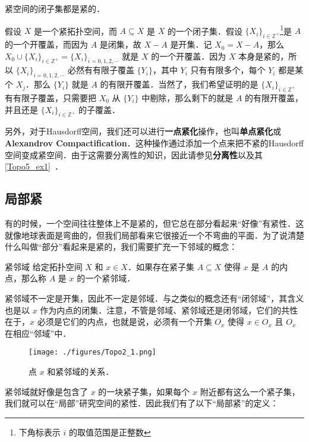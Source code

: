 \begin{theorem}{}\label{Topo2_the2}
紧空间的闭子集都是紧的．
\end{theorem}

假设 $X$ 是一个紧拓扑空间，而 $A\subseteq X$ 是 $X$ 的一个闭子集．假设 $\{X_i\}_{i\in \mathbb{Z}^+}$\footnote{下角标表示 $i$ 的取值范围是正整数}是 $A$ 的一个开覆盖，而因为 $A$ 是闭集，故 $X-A$ 是开集．记 $X_0=X-A$，那么 $X_0\cup\{X_i\}_{i\in \mathbb{Z}^+}=\{X_i\}_{i=0, 1, 2, \cdots}$ 就是 $X$ 的一个开覆盖．因为 $X$ 本身是紧的，所以 $\{X_i\}_{i=0, 1, 2, \cdots}$ 必然有有限子覆盖 $\{Y_i\}$，其中 $Y_i$ 只有有限多个，每个 $Y_i$ 都是某个 $X_j$．那么 $\{Y_i\}$ 就是 $A$ 的有限开覆盖．当然了，我们希望证明的是 $\{X_i\}_{i\in \mathbb{Z}^+}$ 有有限子覆盖，只需要把 $X_0$ 从 $\{Y_i\}$ 中剔除，那么剩下的就是 $A$ 的有限开覆盖，并且还是 $\{X_i\}_{i\in \mathbb{Z}^+}$ 的子覆盖．

另外，对于Hausdorff空间，我们还可以进行\textbf{一点紧化}操作，也叫\textbf{单点紧化}或\textbf{Alexandrov Compactification}．这种操作通过添加一个点来把不紧的Hausdorff空间变成紧空间．由于这需要分离性的知识，因此请参见\textbf{分离性}以及其\autoref{Topo5_ex1}~．

\subsection{局部紧}

有的时候，一个空间往往整体上不是紧的，但它总在部分看起来“好像”有紧性．这就像地球表面是弯曲的，但我们局部看来它很接近一个不弯曲的平面．为了说清楚什么叫做“部分”看起来是紧的，我们需要扩充一下邻域的概念：

\begin{definition}{紧邻域}
给定拓扑空间 $X$ 和 $x\in X$．如果存在紧子集 $A\subseteq X$ 使得 $x$ 是 $A$ 的内点，那么称 $A$ 是 $x$ 的一个紧邻域．
\end{definition}

紧邻域不一定是开集，因此不一定是邻域．与之类似的概念还有“闭邻域”，其含义也是以 $x$ 作为内点的闭集．注意，不管是邻域、紧邻域还是闭邻域，它们的共性在于，$x$ 必须是它们的内点，也就是说，必须有一个开集 $O_x$ 使得 $x\in O_x$ 且 $O_x$ 在相应“邻域”中．

\begin{figure}[ht]
\centering
\texttt{[image: ./figures/Topo2\_1.png]}
\caption{点 $x$ 和紧邻域的关系．} \label{Topo2_fig1}
\end{figure}

紧邻域就好像是包含了 $x$ 的一块紧子集，如果每个 $x$ 附近都有这么一个紧子集，我们就可以在“局部”研究空间的紧性．因此我们有了以下“局部紧”的定义：

